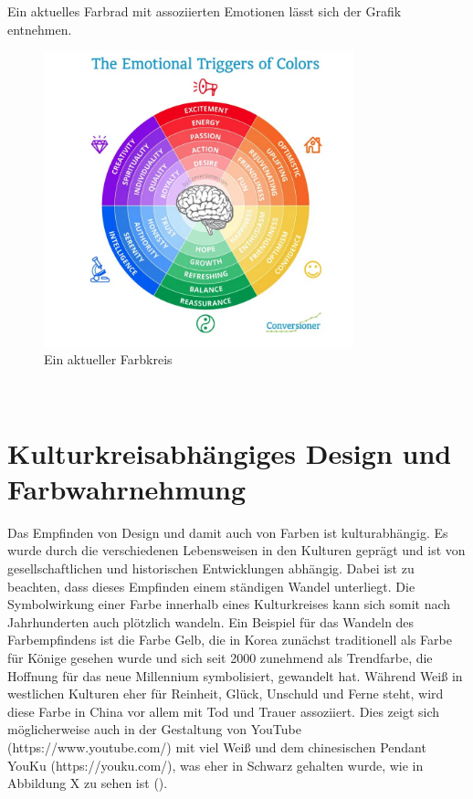 \documentclass[./dokumentation.tex]{subfiles}
\begin{document}
Ein aktuelles Farbrad mit assoziierten Emotionen lässt sich der Grafik entnehmen. \\

\begin{figure}[H]
    \centering
    \includegraphics[width=0.8\textwidth]{bilder/farbkreis.png}
    \caption{Ein aktueller Farbkreis \cite{DesignEmo2003}}
    \label{fig9:farbkreis}
\end{figure}\\

\pagebreak

\section{Kulturkreisabhängiges Design und Farbwahrnehmung}
Das Empfinden von Design und damit auch von Farben ist kulturabhängig. Es wurde durch die verschiedenen Lebensweisen in den Kulturen geprägt und ist von gesellschaftlichen und historischen Entwicklungen abhängig. Dabei ist zu beachten, dass dieses Empfinden einem ständigen Wandel unterliegt. Die Symbolwirkung einer Farbe innerhalb eines Kulturkreises kann sich somit nach Jahrhunderten auch plötzlich wandeln. Ein Beispiel für das Wandeln des Farbempfindens ist die Farbe Gelb, die in Korea zunächst traditionell als Farbe für Könige gesehen wurde und sich seit 2000 zunehmend als Trendfarbe, die Hoffnung für das neue Millennium symbolisiert, gewandelt hat. Während Weiß in westlichen Kulturen eher für Reinheit, Glück, Unschuld und Ferne steht, wird diese Farbe in China vor allem mit Tod und Trauer assoziiert. Dies zeigt sich möglicherweise auch in der Gestaltung von YouTube (https://www.youtube.com/) mit viel Weiß und dem chinesischen Pendant YouKu (https://youku.com/), was eher in Schwarz gehalten wurde, wie in Abbildung X zu sehen ist (\cite{Kunzer2016}).  \pagebreak
\end{document}
